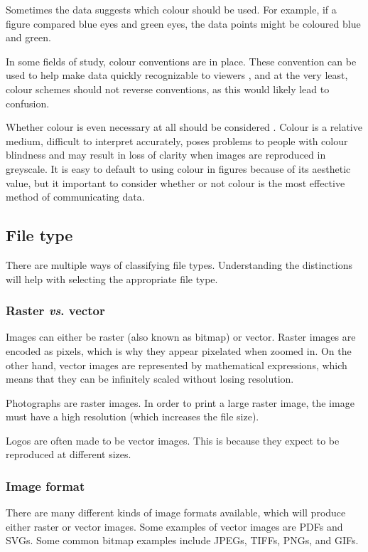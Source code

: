 \documentclass[letterpaper]{article}\usepackage[]{graphicx}\usepackage[]{color}
\begin{document}
Sometimes the data suggests which colour should be used. For example, if a figure compared blue eyes and green eyes, the data points might be coloured blue and green. 

In some fields of study, colour conventions are in place. These convention can be used to help make data quickly recognizable to viewers \cite{rheingans}, and at the very least, colour schemes should not reverse conventions, as this would likely lead to confusion. 

Whether colour is even necessary at all should be considered \cite{wong-avoid-colour}. Colour is a relative medium, difficult to interpret accurately, poses problems to people with colour blindness and may result in loss of clarity when images are reproduced in greyscale. It is easy to default to using colour in figures because of its aesthetic value, but it important to consider whether or not colour is the most effective method of communicating data.

\subsection{File type}
There are multiple ways of classifying file types. Understanding the distinctions will help with selecting the appropriate file type.

\subsubsection{Raster \textit{vs}. vector}
Images can either be raster (also known as bitmap) or vector. Raster images are encoded as pixels, which is why they appear pixelated when zoomed in. On the other hand, vector images are represented by mathematical expressions, which means that they can be infinitely scaled without losing resolution. 

Photographs are raster images. In order to print a large raster image, the image must have a high resolution (which increases the file size). 

Logos are often made to be vector images. This is because they expect to be reproduced at different sizes. 

\subsubsection{Image format}
There are many different kinds of image formats available, which will produce either raster or vector images. Some examples of vector images are PDFs and SVGs. Some common bitmap examples include JPEGs, TIFFs, PNGs, and GIFs. 
\end{document}
